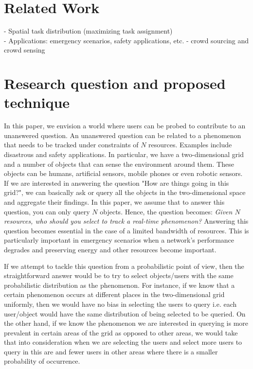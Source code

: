 \documentclass{acm_proc_article-sp}
\begin{document}
\section{Related Work}
- Spatial task distribution (maximizing task assignment)\\
- Applications: emergency scenarios, safety applications, etc. 
- crowd sourcing and crowd sensing

\section{Research question and proposed technique}
In this paper, we envision a world where users can be probed to contribute to an unanswered question. An unanswered question can be related to a phenomenon that needs to be tracked under  constraints of $N$ resources. Examples include disastrous and safety applications. In particular, we have a two-dimensional grid and a number of objects that can sense the environment around them. These objects can be humans, artificial sensors, mobile phones or even robotic sensors. If we are interested in answering the question "How are things going in this grid?", we can basically ask or query all the objects in the two-dimensional space and aggregate their findings. In this paper, we assume that to answer this question, you can only query $N$ objects. Hence, the question becomes: \textit{Given $N$ resources, who should you select to track a real-time phenomenon?} Answering this question becomes essential in the case of a limited bandwidth of resources. This is particularly important in emergency scenarios when a network's performance degrades and preserving energy and other resources become important.\par
If we attempt to tackle this question from a probabilistic point of view, then the straightforward answer would be to try to select objects/users with the same probabilistic distribution as the phenomenon. For instance, if we know that a certain phenomenon occurs at different places in the two-dimensional grid uniformly, then we would have no bias in selecting the users to query i.e. each user/object would have the same distribution of being selected to be queried. On the other hand, if we know the phenomenon we are interested in querying is more prevalent in certain areas of the grid as opposed to other areas, we would take that into consideration when we are selecting the users and select more users to query in this are and fewer users in other areas where there is a smaller probability of occurrence.\par
\end{document}
